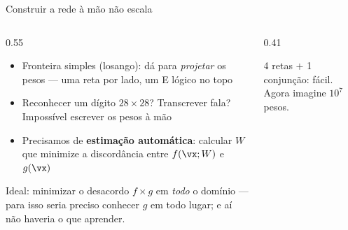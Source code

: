\documentclass[aspectratio=169, 11pt]{beamer}
\begin{document}
\begin{frame}{Construir a rede à mão não escala}
  \begin{columns}[T]
    \begin{column}{0.55\textwidth}
      \begin{itemize}\setlength{\itemsep}{0.4ex}
        \item Fronteira simples (losango): dá para \emph{projetar} os pesos —
              uma reta por lado, um E lógico no topo
        \item Reconhecer um dígito $28{\times}28$? Transcrever fala?
              \alert{Impossível} escrever os pesos à mão
        \item Precisamos de \textbf{estimação automática}: calcular $W$ que
              minimize a discordância entre $f(\vx; W)$ e $g(\vx)$
      \end{itemize}
      \begin{ideiabox}
        Ideal: minimizar o desacordo $f \times g$ em \emph{todo} o domínio —
        para isso seria preciso conhecer $g$ em todo lugar; e aí não haveria
        o que aprender.
      \end{ideiabox}
    \end{column}
    \begin{column}{0.41\textwidth}
      \begin{center}
      \end{center}
      \begin{center}
        {\small\color{icCinza} 4 retas $+$ 1 conjunção: fácil.
        Agora imagine $10^7$ pesos.}
      \end{center}
    \end{column}
  \end{columns}
\end{frame}
\end{document}
